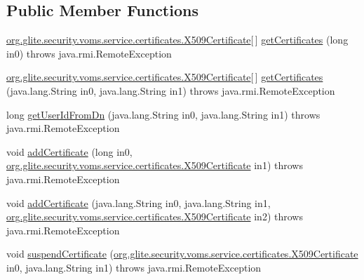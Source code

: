 \subsection*{Public Member Functions}
\begin{DoxyCompactItemize}
\item 
\hyperlink{classorg_1_1glite_1_1security_1_1voms_1_1service_1_1certificates_1_1X509Certificate}{org.glite.security.voms.service.certificates.X509Certificate}\mbox{[}$\,$\mbox{]} \hyperlink{classorg_1_1glite_1_1security_1_1voms_1_1service_1_1certificates_1_1VOMSCertificatesSoapBindingImpl_a0f1d850ba9cfbb2a75721cca49f7051b}{getCertificates} (long in0)  throws java.rmi.RemoteException 
\item 
\hyperlink{classorg_1_1glite_1_1security_1_1voms_1_1service_1_1certificates_1_1X509Certificate}{org.glite.security.voms.service.certificates.X509Certificate}\mbox{[}$\,$\mbox{]} \hyperlink{classorg_1_1glite_1_1security_1_1voms_1_1service_1_1certificates_1_1VOMSCertificatesSoapBindingImpl_a5b826782480d5956e7f0ae07aeb1ab03}{getCertificates} (java.lang.String in0, java.lang.String in1)  throws java.rmi.RemoteException 
\item 
long \hyperlink{classorg_1_1glite_1_1security_1_1voms_1_1service_1_1certificates_1_1VOMSCertificatesSoapBindingImpl_aa89dfee5dceab8ffde103aa9beccc634}{getUserIdFromDn} (java.lang.String in0, java.lang.String in1)  throws java.rmi.RemoteException 
\item 
void \hyperlink{classorg_1_1glite_1_1security_1_1voms_1_1service_1_1certificates_1_1VOMSCertificatesSoapBindingImpl_a03a19f204c2522f5b355c5db003757a0}{addCertificate} (long in0, \hyperlink{classorg_1_1glite_1_1security_1_1voms_1_1service_1_1certificates_1_1X509Certificate}{org.glite.security.voms.service.certificates.X509Certificate} in1)  throws java.rmi.RemoteException 
\item 
void \hyperlink{classorg_1_1glite_1_1security_1_1voms_1_1service_1_1certificates_1_1VOMSCertificatesSoapBindingImpl_a7e55e28775220ff31f9d88275c4280a3}{addCertificate} (java.lang.String in0, java.lang.String in1, \hyperlink{classorg_1_1glite_1_1security_1_1voms_1_1service_1_1certificates_1_1X509Certificate}{org.glite.security.voms.service.certificates.X509Certificate} in2)  throws java.rmi.RemoteException 
\item 
void \hyperlink{classorg_1_1glite_1_1security_1_1voms_1_1service_1_1certificates_1_1VOMSCertificatesSoapBindingImpl_a1f3bb3302c78ddf38914fba8c1bec5f1}{suspendCertificate} (\hyperlink{classorg_1_1glite_1_1security_1_1voms_1_1service_1_1certificates_1_1X509Certificate}{org.glite.security.voms.service.certificates.X509Certificate} in0, java.lang.String in1)  throws java.rmi.RemoteException 

\end{DoxyCompactItemize}
